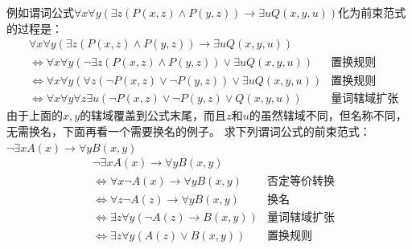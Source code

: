 \documentclass[lang=cn,11pt]{elegantbook}
\begin{document}
例如谓词公式$\forall x\forall y(\exists z(P(x,z)\land P(y,z))\to\exists uQ(x,y,u))$化为前束范式的过程是：
\begin{align*}
&\forall x\forall y(\exists z(P(x,z)\land P(y,z))\to\exists uQ(x,y,u))\\
&\Leftrightarrow \forall x\forall y(\neg\exists z(P(x,z)\land P(y,z))\lor\exists uQ(x,y,u))&\text{置换规则}\\
&\Leftrightarrow \forall x\forall y(\forall z(\neg P(x,z)\lor\neg P(y,z))\lor\exists uQ(x,y,u))&\text{置换规则}\\
&\Leftrightarrow \forall x\forall y\forall z\exists u(\neg P(x,z)\lor\neg P(y,z)\lor Q(x,y,u))&\text{量词辖域扩张}
\end{align*}
由于上面的$x,y$的辖域覆盖到公式末尾，而且$z$和$u$的虽然辖域不同，但名称不同，无需换名，下面再看一个需要换名的例子。
求下列谓词公式的前束范式：$\neg\exists xA(x)\to\forall yB(x,y)$
\begin{align*}
    &\neg\exists xA(x)\to\forall yB(x,y)\\
    &\Leftrightarrow \forall x\neg A(x)\to\forall yB(x,y)&\text{否定等价转换}\\
    &\Leftrightarrow \forall z\neg A(z)\to\forall yB(x,y)&\text{换名}\\
    &\Leftrightarrow \exists z\forall y(\neg A(z)\to B(x,y))&\text{量词辖域扩张}\\
    &\Leftrightarrow \exists z\forall y(A(z)\lor B(x,y))&\text{置换规则}
\end{align*}
\end{document}
